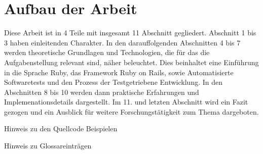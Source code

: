 \section{Aufbau der Arbeit}

Diese Arbeit ist in 4 Teile mit insgesamt 11 Abschnitt gegliedert. Abschnitt 1 bis 3 haben einleitenden Charakter. In den darauffolgenden Abschnitten 4 bis 7 werden theoretische Grundlagen und Technologien, die für das die Aufgabenstellung relevant sind, näher beleuchtet. Dies beinhaltet eine Einführung in die Sprache Ruby, das Framework Ruby on Rails, sowie Automatisierte Softwaretests und den Prozess der Testgetriebene Entwicklung.
In den Abschnitten 8 bis 10 werden dann praktische Erfahrungen und Implemenationsdetails dargestellt. Im 11. und letzten Abschnitt wird ein Fazit gezogen und ein Ausblick für weitere Forschungstätigkeit zum Thema dargeboten.


Hinweis zu den Quellcode Beispielen

Hinweis zu Glossareinträgen
